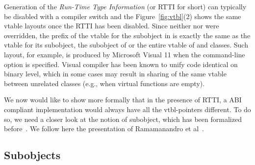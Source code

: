 Generation of the \emph{Run-Time Type Information} (or RTTI for short) can 
typically be disabled with a compiler switch and the Figure~\ref{fig:vtbl}(2) 
shows the same vtable layouts once the RTTI has been disabled. Since neither 
 nor  were overridden, the prefix of the vtable for the 
 subobject in  is exactly the same as the vtable for its 
 subobject, the  subobject of  or the entire vtable of 
 and  classes. Such layout, for example, is produced by 
Microsoft Visual \Cpp{} 11 when the command-line option  is specified. 
Visual \Cpp{} compiler has been known to unify code identical on binary level, 
which in some cases may result in sharing of the same vtable between unrelated 
classes (e.g., when virtual functions are empty).


We now would like to show more formally that in the presence of RTTI, a \Cpp{} ABI 
compliant implementation would always have all the vtbl-pointers different. To do 
so, we need a closer look at the notion of subobject, which has been formalized 
before~\cite{RF95,WNST06,RDL11}. We follow here the presentation of Ramamanandro 
et al~\cite{RDL11}.

\subsection{Subobjects}
\label{sec:subobj}

